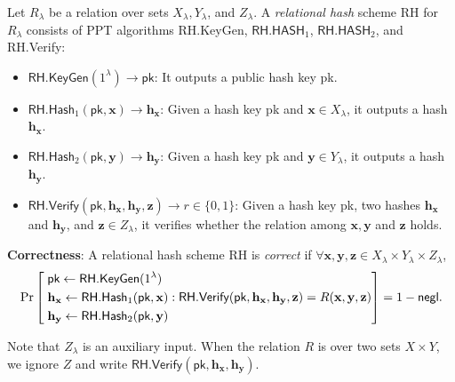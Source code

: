 \begin{definition}
\label{def:rh}
	Let $R_\lambda$ be a relation over sets $X_\lambda, Y_\lambda$, and $ Z_\lambda$. A \emph{relational hash} scheme \textsf{RH} for $R_\lambda$ consists of PPT algorithms \textsf{RH.KeyGen}, $\textsf{RH.HASH}_1$, $\textsf{RH.HASH}_2$, and \textsf{RH.Verify}:
	
	\begin{itemize}
	
		\item $\textsf{RH.KeyGen}(1^\lambda) \to \textsf{pk}$: It outputs a public hash key \textsf{pk}.  
			
		\item $\textsf{RH.Hash}_1(\textsf{pk}, \mathbf{x}) \to \mathbf{h_x}$: Given a hash key \textsf{pk} and $\mathbf{x} \in X_\lambda$, it outputs a hash $\mathbf{h_x}$.

		\item $\textsf{RH.Hash}_2(\textsf{pk}, \mathbf{y}) \to \mathbf{h_y}$: Given a hash key \textsf{pk} and $\mathbf{y} \in Y_\lambda$, it outputs a hash $\mathbf{h_y}$.

		\item $\textsf{RH.Verify}(\textsf{pk}, \mathbf{h_x}, \mathbf{h_y}, \mathbf{z}) \to r \in \{0, 1\}$: Given a hash key \textsf{pk}, two hashes $\mathbf{h_x}$ and $\mathbf{h_y}$, and $\mathbf{z} \in Z_\lambda$, it verifies whether the relation among $\mathbf{x}, \mathbf{y}$ and $\mathbf{z}$ holds.

	\end{itemize}

	\noindent \textbf{Correctness}: A relational hash scheme \textsf{RH} is \emph{correct} if $\forall \mathbf{x}, \mathbf{y}, \mathbf{z} \in X_\lambda \times Y_\lambda \times Z_\lambda$,
	\[
		\Pr \left [
			\begin{aligned} 
				 &\; \textsf{pk} \gets \textsf{RH.KeyGen}(1^\lambda) \\
				 &\; \mathbf{h_x} \gets \textsf{RH.Hash}_1(\textsf{pk}, \mathbf{x}) \\
				 &\; \mathbf{h_y} \gets \textsf{RH.Hash}_2(\textsf{pk}, \mathbf{y})
			\end{aligned} :
			\textsf{RH.Verify}(\textsf{pk}, \mathbf{h_x}, \mathbf{h_y}, \mathbf{z}) = R(\mathbf{x}, \mathbf{y}, \mathbf{z})
			\right ] = 1 - \mathsf{negl}.
	\]
\end{definition}
Note that $Z_\lambda$ is an auxiliary input. When the relation $R$ is over two sets $X \times Y$, we ignore $Z$ and write $\textsf{RH.Verify}(\textsf{pk}, \mathbf{h_x}, \mathbf{h_y})$.


